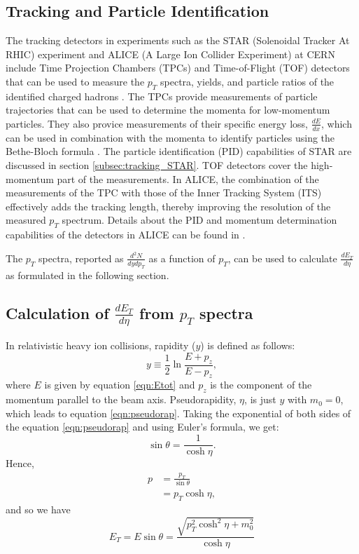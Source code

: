 \subsection{Tracking and Particle Identification}\label{tracking}
The tracking detectors in experiments such as the STAR (Solenoidal Tracker At RHIC) experiment and ALICE (A Large Ion Collider Experiment) at CERN include Time Projection Chambers (TPCs) and Time-of-Flight (TOF) detectors that can be used to measure the $p_{T}$ spectra, yields, and particle ratios of the identified charged hadrons \cite{Preghenella:2011vy, PhysRevC.96.044904}. The TPCs provide measurements of particle trajectories that can be used to determine the momenta for low-momentum particles. They also provice measurements of their specific energy loss, $\frac{dE}{dx}$, which can be used in combination with the momenta to identify particles using the Bethe-Bloch formula \cite{bethe1953passage}. The particle identification (PID) capabilities of STAR are discussed in section \ref{subsec:tracking_STAR}. TOF detectors cover the high-momentum part of the measurements. In ALICE, the combination of the measurements of the TPC with those of the Inner Tracking System (ITS) effectively adds the tracking length, thereby improving the resolution of the measured $p_{T}$ spectrum. Details about the PID and momentum determination capabilities of the detectors in ALICE can be found in \cite{1748-0221-3-08-S08002}.

The $p_{T}$ spectra, reported as $\frac{d^{2}N}{dydp_{T}}$ as a function of $p_{T}$, can be used to calculate $\frac{dE_{T}}{d\eta}$ as formulated in the following section.

\subsection{Calculation of $\frac{dE_{T}}{d\eta}$ from $p_{T}$ spectra}\label{section:calcFromSpectra}
In relativistic heavy ion collisions, rapidity ($y$) is defined as follows:
\begin{equation}\label{eqn:rapidity}
y\equiv\frac{1}{2}\ln{\frac{E + p_{z}}{E - p_{z}}},
\end{equation}
where $E$ is given by equation \ref{eqn:Etot} and $p_{z}$ is the component of the momentum parallel to the beam axis.
Pseudorapidity, $\eta$, is just $y$ with $m_{0} = 0$, which leads to equation \ref{eqn:pseudorap}. Taking the exponential of both sides of the equation \ref{eqn:pseudorap} and using Euler's formula, we get:
\begin{equation}
\sin\theta = \frac{1}{\cosh\eta}.
\end{equation}
Hence,
\begin{align*}
p &= \frac{p_{T}}{\sin\theta}\\
&= p_{T}\cosh\eta,
\end{align*}
and so we have
\begin{equation}\label{eqn:ET-as-pTOverJacobian}
E_{T} = E\sin\theta = \frac{\sqrt{p_{T}^2\cosh^2\eta+m_{0}^2}}{\cosh\eta} 
\end{equation}

